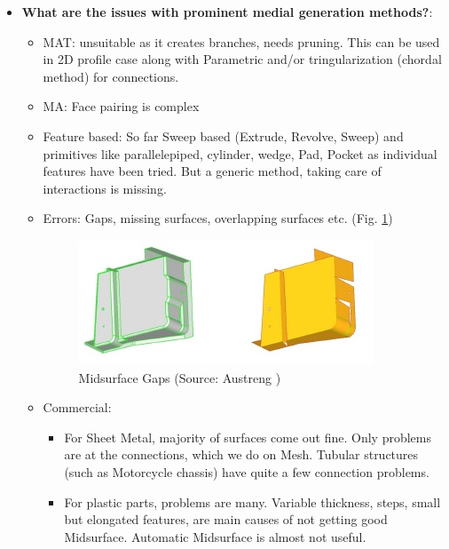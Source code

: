 \begin{itemize}[noitemsep,topsep=2pt,parsep=2pt,partopsep=2pt,leftmargin=*]
\item \textbf{What are the issues with prominent medial generation methods?}: 
	\begin{itemize}[noitemsep,topsep=2pt,parsep=2pt,partopsep=2pt,leftmargin=*]
	\item MAT: unsuitable as it creates branches, needs pruning. This can be used in 2D profile case along with Parametric and/or tringularization (chordal method) for connections.
	\item MA: Face pairing is complex
	\item Feature based: So far Sweep based (Extrude, Revolve, Sweep) and primitives like parallelepiped, cylinder, wedge, Pad, Pocket as individual features have been tried. But a generic method, taking care of interactions is missing.
	\item Errors: Gaps, missing surfaces, overlapping surfaces etc. (Fig. \ref{fig:litsurvey:gaps})
	


		\begin{figure} [h]
		\centering
		\includegraphics[width=0.6\linewidth]{..//Common/images/MidsurfaceGaps}
		\caption{Midsurface Gaps (Source: Austreng \cite{Austreng2007})}
		\label{fig:litsurvey:gaps}
	\end{figure}
	


	\item Commercial:
		\begin{itemize}[noitemsep,topsep=2pt,parsep=2pt,partopsep=2pt,leftmargin=*]
		\item For Sheet Metal, majority of surfaces come out fine. Only problems are at the connections, which we do on Mesh. Tubular structures (such as Motorcycle chassis) have quite a few connection problems. 
		\item For plastic parts, problems are many. Variable thickness, steps, small but elongated features, are main causes of not getting good Midsurface.  Automatic Midsurface is almost not useful.
	\end{itemize}

	\end{itemize}
	
\end{itemize}	

